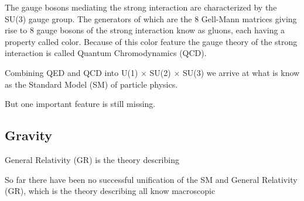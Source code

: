 The gauge bosons mediating the strong interaction are characterized by the SU(3) gauge group. The generators of which are the 8 Gell-Mann matrices giving rise to 8 gauge bosons of the strong interaction know as gluons, each having a property called color. Because of this color feature the gauge theory of the strong interaction is called Quantum Chromodynamics (QCD).

Combining QED and QCD into U(1) $\times$ SU(2) $\times$ SU(3) we arrive at what is know as the Standard Model (SM) of particle physics.

But one important feature is still missing.

\subsection{Gravity}
General Relativity (GR) is the theory describing


So far there have been no successful unification of the SM and General Relativity (GR), which is the theory describing all know macroscopic